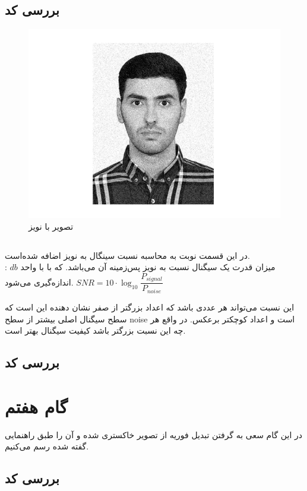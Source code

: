 \subsection{بررسی کد}
\lr{}
\begin{figure}[H]
    \centering
    \includegraphics[width=0.65\linewidth]{images/noisy.png}
    \caption{ تصویر با نویز }
    \label{fig:h}
\end{figure}

\subsection{}
در این قسمت نوبت به محاسبه نسبت سینگال به نویز اضافه شده‌است. 
\\
:
میزان قدرت یک سیگنال نسبت به نویز پس‌زمینه آن می‌باشد.
که با با واحد 
\(db\)
اندازه‌گیری می‌شود.
\null \hfill $ SNR =  10 \cdot \log_{10} \dfrac{P_{signal}}{P_{noise}}$

این نسبت می‌تواند هر عددی باشد که اعداد بزرگتر از صفر نشان دهنده این است که سطح سیگنال اصلی بیشتر از سطح noise است 
و اعداد کوچکتر برعکس. 
در واقع هر چه این نسبت بزرگتر باشد کیفیت سیگنال بهتر است.

\subsection{بررسی کد}
\lr{}


\section{گام هفتم}
در این گام سعی به گرفتن تبدیل فوریه از تصویر خاکستری شده و آن را طبق راهنمایی گفته شده رسم می‌کنیم.
\\
\subsection{بررسی کد}
\lr{}

